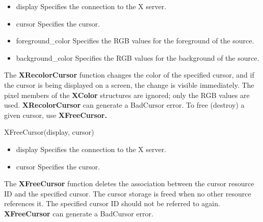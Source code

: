 \documentclass{report}
\begin{document}
\begin{itemize}
\begin{itemize}
                \item display Specifies the connection to the X server.
                \item cursor Specifies the cursor.
                \item foreground\_color Specifies the RGB values for the foreground of the source.
                \item background\_color Specifies the RGB values for the background of the source.
            \end{itemize}
            The \textbf{XRecolorCursor} function changes the color of the specified cursor, and if the cursor is being displayed on a screen, the change is visible immediately. The pixel members of the \textbf{XColor} structures are ignored; only the RGB values are used.
            \bigbreak \noindent 
            \textbf{XRecolorCursor} can generate a BadCursor error.
            \bigbreak \noindent 
            To free (destroy) a given cursor, use \textbf{XFreeCursor.}
            \bigbreak \noindent 
            \begin{cppcode}
                XFreeCursor(display, cursor)
            \end{cppcode}
            \begin{itemize}
                \item display Specifies the connection to the X server.
                \item cursor Specifies the cursor.
            \end{itemize}
            The \textbf{XFreeCursor} function deletes the association between the cursor resource ID and the specified cursor. The cursor storage is freed when no other resource references it. The specified cursor ID should not be referred to again.
            \bigbreak \noindent 
            \textbf{XFreeCursor} can generate a BadCursor error.
    \end{itemize}
\end{document}
